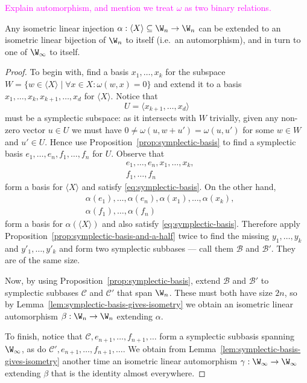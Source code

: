 \textcolor{magenta}{Explain automorphism, and mention we treat $\omega$ as two binary relations.}

\begin{proposition} \label{prop:symplectic-witt-extension}
    Any isometric linear injection $\alpha : \langle X \rangle \subseteq \W_n \to \W_n$ 
    can be extended to an isometric linear bijection of $\W_n$ to itself (i.e.~an automorphism),
    and in turn to one of $\W_\infty$ to itself.
\end{proposition}

\begin{proof}
    To begin with, find a basis $x_1, \ldots, x_k$ for the subspace $W = \{ w \in \langle X \rangle \mid \forall x \in X : \omega(w, x) = 0 \}$ 
    and extend it to a basis \(
        x_1, \ldots, x_k, x_{k+1}, \ldots, x_d
    \) for $\langle X \rangle$.
    Notice that
    \[
        U = \langle x_{k+1}, \ldots, x_d \rangle
    \] must be a symplectic subspace:
    as it intersects with $W$ trivially, 
    given any non-zero vector $u \in U$ we must have $0 \neq \omega(u, w + u') = \omega(u, u')$ for some $w \in W$ and $u' \in U$.
    Hence use Proposition~\ref{prop:symplectic-basis} to find a symplectic basis
    \(
        e_1, \ldots, e_n,
        f_1, \ldots, f_n
    \)
    for $U$.
    Observe that 
    \begin{align*}
        &e_1, \ldots, e_n, x_1, \ldots, x_k, \\
        &f_1, \ldots, f_n
    \end{align*}
    form a basis for $\langle X \rangle$ and satisfy \eqref{eq:symplectic-basis}.
    On the other hand,
    \begin{align*}
        &\alpha(e_1), \ldots, \alpha(e_n), \alpha(x_1), \ldots, \alpha(x_k), \\
        &\alpha(f_1), \ldots, \alpha(f_n)
    \end{align*}
    form a basis for $\alpha(\langle X \rangle)$ and also satisfy \eqref{eq:symplectic-basis}.
    Therefore apply Proposition~\ref{prop:symplectic-basis-and-a-half} twice to find the missing 
    $y_1, \ldots, y_k$ and $y'_1, \ldots, y'_k$ and form two symplectic subbases --- call them $\mathcal{B}$ and $\mathcal{B}'$.
    They are of the same size.

    Now, by using Proposition~\ref{prop:symplectic-basis}, extend $\mathcal{B}$ and $\mathcal{B}'$ to symplectic subbases $\mathcal{C}$ and $\mathcal{C}'$ that span $\W_n$.
    These must both have size $2n$, 
    so by Lemma~\ref{lem:symplectic-basis-gives-isometry} we obtain an isometric linear automorphism $\beta : \W_n \to \W_n$ extending $\alpha$.

    To finish, notice that $\mathcal{C}, e_{n+1}, \ldots, f_{n+1}, \ldots$ form a symplectic subbasis spanning $\W_\infty$, as do $\mathcal{C}', e_{n+1}, \ldots, f_{n+1}, \ldots$.
    We obtain from Lemma~\ref{lem:symplectic-basis-gives-isometry} another time an isometric linear automorphism $\gamma : \W_\infty \to \W_\infty$ extending $\beta$ 
    that is the identity almost everywhere.
\end{proof}


